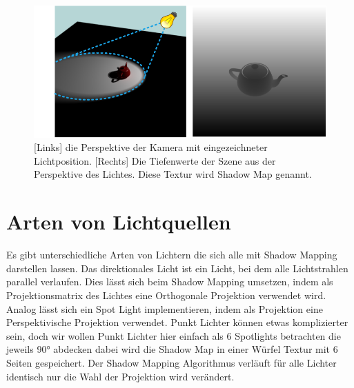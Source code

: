 \begin{figure}
	\begin{center}
		\includegraphics[width=1\textwidth]{res/img/shadow-mapping/shadow_map_principle.png}
    \caption{[Links] die Perspektive der Kamera mit eingezeichneter Lichtposition. 
    [Rechts] Die Tiefenwerte der Szene aus der Perspektive des Lichtes. 
    Diese Textur wird Shadow Map genannt.}
    \label{fig:shadow-map}
	\end{center}
\end{figure}
\section{Arten von Lichtquellen}
\label{section:types-of-sources}
Es gibt unterschiedliche Arten von Lichtern die sich alle mit Shadow Mapping darstellen lassen.
Das direktionales Licht ist ein Licht, bei dem alle Lichtstrahlen parallel verlaufen.
Dies lässt sich beim Shadow Mapping umsetzen, indem als Projektionsmatrix des Lichtes eine
Orthogonale Projektion verwendet wird.
Analog lässt sich ein Spot Light implementieren, indem als Projektion eine Perspektivische Projektion verwendet.
Punkt Lichter können etwas komplizierter sein, doch wir wollen Punkt Lichter hier einfach als 6 Spotlights betrachten
die jeweils 90° abdecken dabei wird die Shadow Map in einer Würfel Textur mit 6 Seiten gespeichert.
Der Shadow Mapping Algorithmus verläuft für alle Lichter identisch nur die Wahl der Projektion wird verändert.

